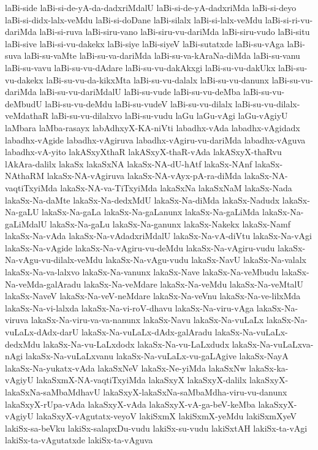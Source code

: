 {laBi-side
laBi-si-de-yA-da-dadxriMdalU
laBi-si-de-yA-dadxriMda
laBi-si-deyo
laBi-si-didx-lalx-veMdu
laBi-si-doDane
laBi-silalx
laBi-si-lalx-veMdu
laBi-si-ri-vu-dariMda
laBi-si-ruva
laBi-siru-vano
laBi-siru-vu-dariMda
laBi-siru-vudo
laBi-situ
laBi-sive
laBi-si-vu-dakekx
laBi-siye
laBi-siyeV
laBi-sutatxde
laBi-su-vAga
laBi-suva
laBi-su-vaMte
laBi-su-va-dariMda
laBi-su-va-kAraNa-diMda
laBi-su-vanu
laBi-su-vavu
laBi-su-vu-dAdare
laBi-su-vu-dakAkxgi
laBi-su-vu-dakUkx
laBi-su-vu-dakekx
laBi-su-vu-da-kikxMta
laBi-su-vu-dalalx
laBi-su-vu-danunx
laBi-su-vu-dariMda
laBi-su-vu-dariMdalU
laBi-su-vude
laBi-su-vu-deMba
laBi-su-vu-deMbudU
laBi-su-vu-deMdu
laBi-su-vudeV
laBi-su-vu-dilalx
laBi-su-vu-dilalx-veMdathaR
laBi-su-vu-dilalxvo
laBi-su-vudu
laGu
laGu-vAgi
laGu-vAgiyU
laMbara
laMba-rasayx
labAdhxyX-KA-niVti
labadhx-vAda
labadhx-vAgidadx
labadhx-vAgide
labadhx-vAgiruva
labadhx-vAgiru-vu-dariMda
labadhx-vAguva
labadhx-vA-yito
lakASxyXthaR
lakASxyX-thaR-vAda
lakASxyX-thaRvu
lAkAra-dalilx
lakaSx
lakaSxNA
lakaSx-NA-dU-hAtf
lakaSx-NAnf
lakaSx-NAthaRM
lakaSx-NA-vAgiruva
lakaSx-NA-vAyx-pA-ra-diMda
lakaSx-NA-vaqtiTxyiMda
lakaSx-NA-va-TiTxyiMda
lakaSxNa
lakaSxNaM
lakaSx-Nada
lakaSx-Na-daMte
lakaSx-Na-dedxMdU
lakaSx-Na-diMda
lakaSx-Nadudx
lakaSx-Na-gaLU
lakaSx-Na-gaLa
lakaSx-Na-gaLanunx
lakaSx-Na-gaLiMda
lakaSx-Na-gaLiMdalU
lakaSx-Na-gaLu
lakaSx-Na-ganunx
lakaSx-Nakekx
lakaSx-Namf
lakaSx-Na-vAda
lakaSx-Na-vAdadxriMdalU
lakaSx-Na-vA-diVtu
lakaSx-Na-vAgi
lakaSx-Na-vAgide
lakaSx-Na-vAgiru-vu-deMdu
lakaSx-Na-vAgiru-vudu
lakaSx-Na-vAgu-vu-dilalx-veMdu
lakaSx-Na-vAgu-vudu
lakaSx-NavU
lakaSx-Na-valalx
lakaSx-Na-va-lalxvo
lakaSx-Na-vanunx
lakaSx-Nave
lakaSx-Na-veMbudu
lakaSx-Na-veMda-galAradu
lakaSx-Na-veMdare
lakaSx-Na-veMdu
lakaSx-Na-veMtalU
lakaSx-NaveV
lakaSx-Na-veV-neMdare
lakaSx-Na-veVnu
lakaSx-Na-ve-lilxMda
lakaSx-Na-vi-lalxda
lakaSx-Na-vi-roV-dhavu
lakaSx-Na-viru-vAga
lakaSx-Na-viruva
lakaSx-Na-viru-va-va-nanunx
lakaSx-Navu
lakaSx-Na-vuLaLx
lakaSx-Na-vuLaLx-dAdx-darU
lakaSx-Na-vuLaLx-dAdx-galAradu
lakaSx-Na-vuLaLx-dedxMdu
lakaSx-Na-vu-LaLxdodx
lakaSx-Na-vu-LaLxdudx
lakaSx-Na-vuLaLxva-nAgi
lakaSx-Na-vuLaLxvanu
lakaSx-Na-vuLaLx-vu-gaLAgive
lakaSx-NayA
lakaSx-Na-yukatx-vAda
lakaSxNeV
lakaSx-Ne-yiMda
lakaSxNw
lakaSx-ka-vAgiyU
lakaSxmX-NA-vaqtiTxyiMda
lakaSxyX
lakaSxyX-dalilx
lakaSxyX-lakaSxNa-saMbaMdhavU
lakaSxyX-lakaSxNa-saMbaMdha-viru-vu-danunx
lakaSxyX-rUpa-vAda
lakaSxyX-vAda
lakaSxyX-vA-ga-beV-keMba
lakaSxyX-vAgiyU
lakaSxyX-vAgutatx-veyoV
lakiSxmX
lakiSxmX-yeMdu
lakiSxmXyeV
lakiSx-sa-beVku
lakiSx-salapxDu-vudu
lakiSx-su-vudu
lakiSxtAH
lakiSx-ta-vAgi
lakiSx-ta-vAgutatxde
lakiSx-ta-vAguva
}
